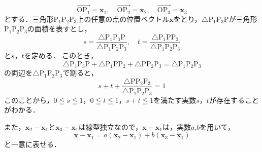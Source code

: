 \begin{tproof}
  \[
    \overrightarrow{\mathrm{OP_1}}=\bm{x}_1,\quad \overrightarrow{\mathrm{OP_2}}=\bm{x}_2,\quad \overrightarrow{\mathrm{OP_3}}=\bm{x}_3
  \]
  とする．三角形$\mathrm{P}_1 \mathrm{P}_2 \mathrm{P}_3$上の任意の点の位置ベクトル$\bm{x}$をとり，$\triangle{\mathrm{P}_1 \mathrm{P}_3 \mathrm{P}}$が三角形$\mathrm{P}_1 \mathrm{P}_2 \mathrm{P}_3$の面積を表すとし，
  \[
    s = \frac{ \triangle{\mathrm{P}_1 \mathrm{P}_3 \mathrm{P}}} { \triangle{\mathrm{P}_1 \mathrm{P}_2 \mathrm{P}_3}},\quad t = \frac{ \triangle{\mathrm{P}_1 \mathrm{P} \mathrm{P}_2}} { \triangle{\mathrm{P}_1 \mathrm{P}_2 \mathrm{P}_3}}
  \]
  と$s$，$t$を定める．
  このとき，
  \[
    \triangle{\mathrm{P}_1 \mathrm{P}_3 \mathrm{P}} +\triangle{\mathrm{P}_1 \mathrm{P} \mathrm{P}_2}+ \triangle{\mathrm{P} \mathrm{P}_2 \mathrm{P}_3} = \triangle{\mathrm{P}_1 \mathrm{P}_2 \mathrm{P}_3}
  \]
  の両辺を$ \triangle{\mathrm{P}_1 \mathrm{P}_2 \mathrm{P}_3}$で割ると，
  \[
    s+t + \frac{ \triangle{\mathrm{P} \mathrm{P}_2 \mathrm{P}_3}} { \triangle{\mathrm{P}_1 \mathrm{P}_2 \mathrm{P}_3}} = 1
  \]
  このことから，$ 0 \leqq s \leqq 1$，$0 \leqq t \leqq 1$，$s+t \leqq 1$を満たす実数$s$，$t$が存在することがわかる．

  また，$\bm{x}_2 -\bm{x}_1$と$\bm{x}_3 -\bm{x}_1$は線型独立なので，$\bm{x}-\bm{x}_1$は，実数$a$,$b$を用いて，
  \[
    \bm{x} - \bm{x}_1 = a(\bm{x}_2 - \bm{x}_1) + b(\bm{x}_3 - \bm{x}_1)
  \]
  と一意に表せる．


\end{tproof}
